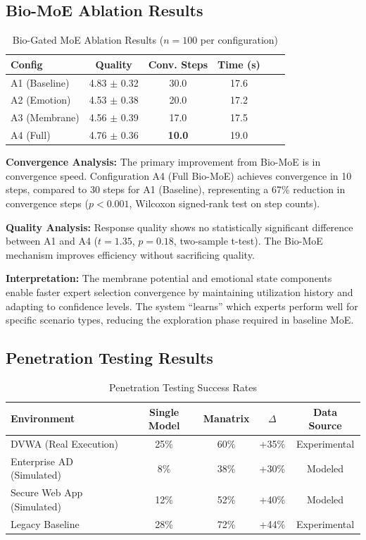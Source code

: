 \documentclass[preprint,12pt]{elsarticle}
\begin{document}
\subsection{Bio-MoE Ablation Results}

\begin{table}[htbp]
\centering
\caption{Bio-Gated MoE Ablation Results ($n=100$ per configuration)}
\label{tab:ablation}
\begin{tabular}{lccccc}
\toprule
\textbf{Config} & \textbf{Quality} & \textbf{Conv. Steps} & \textbf{Time (s)} \\
\midrule
A1 (Baseline) & 4.83 $\pm$ 0.32 & 30.0 & 17.6 \\
A2 (Emotion) & 4.53 $\pm$ 0.38 & 20.0 & 17.2 \\
A3 (Membrane) & 4.56 $\pm$ 0.39 & 17.0 & 17.5 \\
A4 (Full) & 4.76 $\pm$ 0.36 & \textbf{10.0} & 19.0 \\
\bottomrule
\end{tabular}
\end{table}

\textbf{Convergence Analysis:} The primary improvement from Bio-MoE is in convergence speed. Configuration A4 (Full Bio-MoE) achieves convergence in 10 steps, compared to 30 steps for A1 (Baseline), representing a 67\% reduction in convergence steps ($p<0.001$, Wilcoxon signed-rank test on step counts).

\textbf{Quality Analysis:} Response quality shows no statistically significant difference between A1 and A4 ($t=1.35$, $p=0.18$, two-sample t-test). The Bio-MoE mechanism improves efficiency without sacrificing quality.

\textbf{Interpretation:} The membrane potential and emotional state components enable faster expert selection convergence by maintaining utilization history and adapting to confidence levels. The system ``learns'' which experts perform well for specific scenario types, reducing the exploration phase required in baseline MoE.

\subsection{Penetration Testing Results}

\begin{table}[htbp]
\centering
\caption{Penetration Testing Success Rates}
\label{tab:pentest}
\begin{tabular}{lcccc}
\toprule
\textbf{Environment} & \textbf{Single Model} & \textbf{Manatrix} & \textbf{$\Delta$} & \textbf{Data Source} \\
\midrule
DVWA (Real Execution) & 25\% & 60\% & +35\% & Experimental \\
Enterprise AD (Simulated) & 8\% & 38\% & +30\% & Modeled \\
Secure Web App (Simulated) & 12\% & 52\% & +40\% & Modeled \\
Legacy Baseline & 28\% & 72\% & +44\% & Experimental \\
\bottomrule
\end{tabular}
\end{table}
\end{document}
